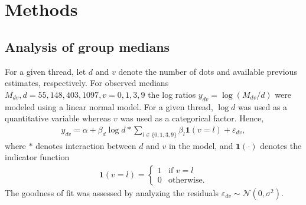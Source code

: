\documentclass[10pt,a4paper,twocolumn,lineno]{article}
\begin{document}
\section{Methods}
\subsection{Analysis of group medians}

For a given thread, let $d$ and $v$ denote the number of dots and available previous estimates, respectively. For observed medians $M_{dv}, d=55,148,403,1097, v = 0,1,3,9$ the log ratios $y_{dv} = \log (M_{dv}/d)$ were modeled using a linear normal model. For a given thread, $\log{d}$ was used as a quantitative variable whereas $v$ was used as a categorical factor. Hence, 
\begin{align}
	y_{dv} %
	= \alpha+\beta_d\log{d} * \sum_{l\in\{0,1,3,9\}}\beta_l\mathbf{1}(v=l)+\varepsilon_{dv}, \label{eq: median model}
\end{align}
where $*$ denotes interaction between $d$ and $v$ in the model, and $\mathbf{1}(\cdot)$ denotes the indicator function
\begin{align*}
\mathbf{1}(v=l) = \begin{cases}
								1 &\text{if } v=l \\
								0 &\text{otherwise}.
							\end{cases}
\end{align*}
The goodness of fit was assessed by analyzing the residuals $\varepsilon_{dv} \sim \mathcal{N}(0,\sigma^2)$. 
\end{document}
